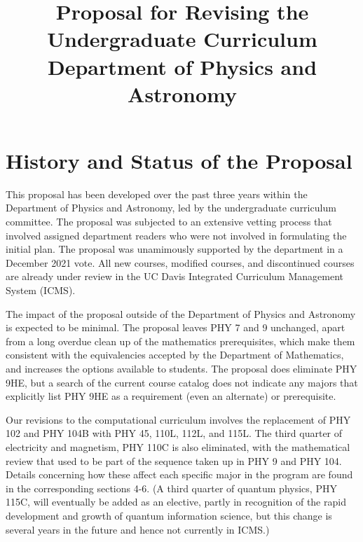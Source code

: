 \documentclass[12pt]{article}
\begin{document}


\title{Proposal for Revising the Undergraduate Curriculum \\
Department of Physics and Astronomy}

\maketitle

\section{History and Status of the Proposal}

This proposal has been developed over the past three years within the
Department of Physics and Astronomy, 
led by the undergraduate curriculum committee.
The proposal was subjected to an extensive vetting process that
involved assigned department readers who were not involved in
formulating the initial plan.  The proposal was unamimously supported
by the department in a December 2021 vote.
All new courses, modified courses, and
discontinued courses are already under review in the 
UC Davis Integrated Curriculum Management System (ICMS).


The impact of the proposal outside of the Department of Physics 
and Astronomy is
expected to be minimal. The proposal leaves PHY 7 and 9 unchanged,
apart from a long overdue clean up of the mathematics prerequisites,
which make them consistent with the equivalencies accepted by the
Department of Mathematics, and increases the options available to
students.  The proposal does eliminate PHY 9HE, but a search of the
current course catalog does not indicate any majors that explicitly
list PHY 9HE as a requirement (even an alternate) or prerequisite.

Our revisions to the computational curriculum
involves the replacement of
PHY 102 and PHY 104B with
PHY 45, 110L, 112L, and 115L.
The third quarter of electricity and magnetism, PHY 110C is also 
eliminated, with the mathematical review that used to
be part of the sequence taken up in PHY 9 and PHY 104.
Details concerning how these affect each specific major in the 
program are found in the corresponding sections 4-6.
(A third quarter of quantum physics, PHY 115C, will eventually be added
as an elective, partly
in recognition of the rapid development and growth of quantum
information science,
but this change is several years in the future and hence not currently
in ICMS.)
\end{document}
